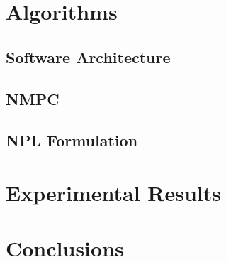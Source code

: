\documentclass[]{article}
\begin{document}
\section*{Algorithms}
\subsection*{Software Architecture}

\subsection*{NMPC}
\subsection*{NPL Formulation}

\section*{Experimental Results}
\section*{Conclusions}

	



\end{document}
